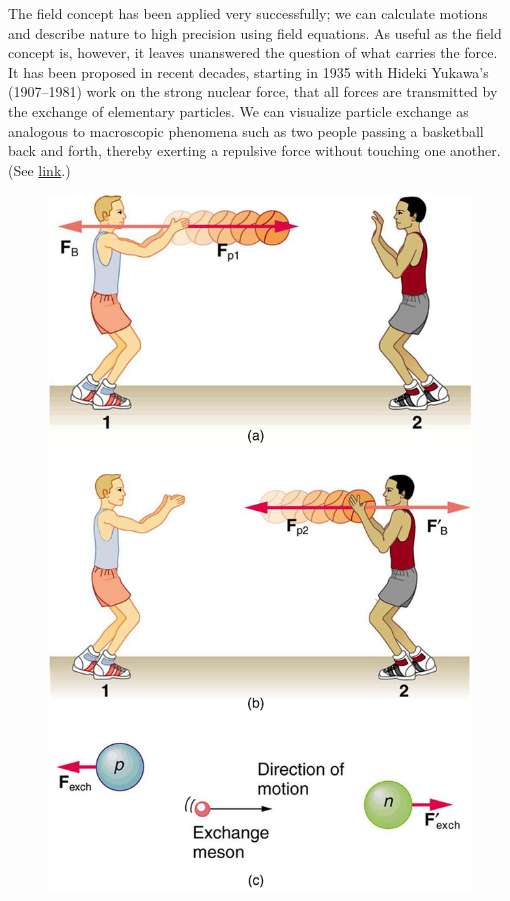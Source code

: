 \documentclass[
]{book}
\begin{document}
The field concept has been applied very successfully; we can calculate
motions and describe nature to high precision using field equations. As
useful as the field concept is, however, it leaves unanswered the
question of what carries the force. It has been proposed in recent
decades, starting in 1935 with Hideki Yukawa's (1907--1981) work on the
strong nuclear force, that all forces are transmitted by the exchange of
elementary particles. We can visualize particle exchange as analogous to
macroscopic phenomena such as two people passing a basketball back and
forth, thereby exerting a repulsive force without touching one another.
(See \protect\hyperlink{import-auto-id2011579}{link}.)

\begin{figure}
\hypertarget{import-auto-id2011579}{%
\centering
\includegraphics{images/Figure_04_08_02.jpg}
}
\end{figure}
\end{document}
